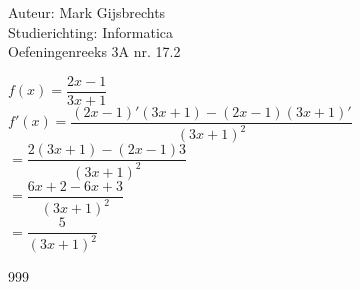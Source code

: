 \documentclass[a4paper]{article}
\begin{document}
\noindent \large Auteur: Mark Gijsbrechts \\
\noindent \large Studierichting: Informatica\\
\noindent \large Oefeningenreeks 3A nr. 17.2\\

\medskip

\normalsize





$f(x) = \dfrac{2x - 1}{3x + 1} $ \\

$f'(x) = \dfrac{(2x-1)'(3x+1)-(2x-1)(3x+1)'}{(3x + 1)^2} $ \\

$ = \dfrac{2(3x+1)-(2x-1)3}{(3x+1)^2} $ \\

$ = \dfrac{6x + 2 - 6x + 3}{(3x+1)^2} $ \\

$ = \dfrac{5}{(3x+1)^2} $ 


\begin{thebibliography}{999}
\end{thebibliography}
\end{document}
